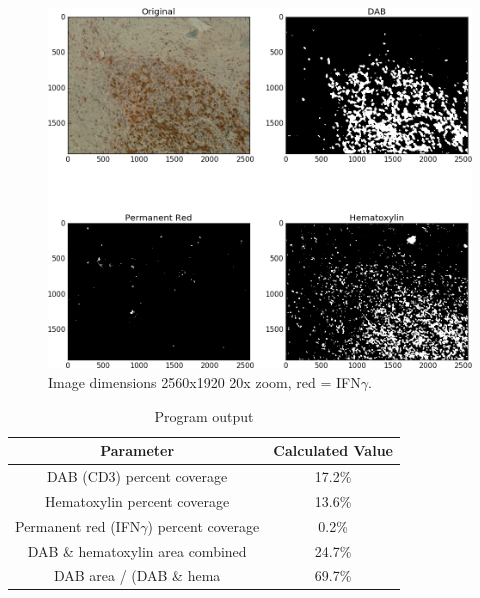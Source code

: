\documentclass[12pt]{article}
\begin{document}
\begin{figure}[H]
  \includegraphics[width=\linewidth]{10_IFNg_20x.png}
  \caption{Image dimensions 2560x1920
20x zoom, red = IFN$\gamma$.}
  \label{fig:10 IFNg}
\end{figure}


\begin{table}[H]
\centering
\caption{Program output}
\label{program output}
\begin{tabular}{|c|c|}
\hline
\textbf{Parameter} & \textbf{Calculated Value} \\ \hline
DAB (CD3) percent coverage & 17.2\% \\ \hline
Hematoxylin percent coverage & 13.6\% \\ \hline
Permanent red (IFN$\gamma$) percent coverage & 0.2\% \\ \hline
DAB \& hematoxylin area combined & 24.7\% \\ \hline
DAB area / (DAB \& hema & 69.7\% \\ \hline
\end{tabular}
\end{table}

\end{document}

